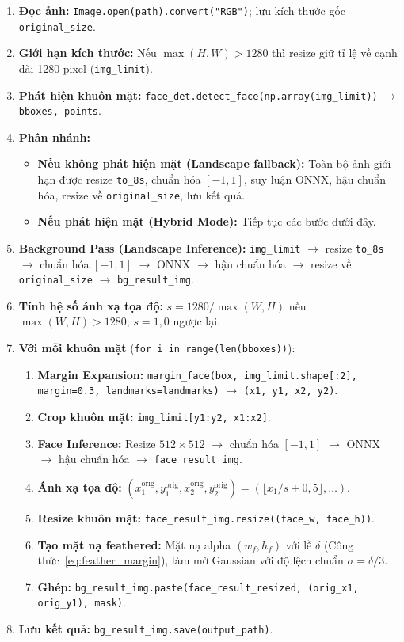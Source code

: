 \begin{enumerate}
    \item \textbf{Đọc ảnh:} \texttt{Image.open(path).convert("RGB")}; lưu kích thước gốc \texttt{original\_size}.
    \item \textbf{Giới hạn kích thước:} Nếu $\max(H,W) > 1280$ thì resize giữ tỉ lệ về cạnh dài 1280 pixel (\texttt{img\_limit}).
    \item \textbf{Phát hiện khuôn mặt:} \texttt{face\_det.detect\_face(np.array(img\_limit))} $\to$ \texttt{bboxes, points}.
    \item \textbf{Phân nhánh:}
    \begin{itemize}
        \item \textbf{Nếu không phát hiện mặt (Landscape fallback):} Toàn bộ ảnh giới hạn được resize \texttt{to\_8s}, chuẩn hóa $[-1,1]$, suy luận ONNX, hậu chuẩn hóa, resize về \texttt{original\_size}, lưu kết quả.
        \item \textbf{Nếu phát hiện mặt (Hybrid Mode):} Tiếp tục các bước dưới đây.
    \end{itemize}
    \item \textbf{Background Pass (Landscape Inference):} \texttt{img\_limit} $\to$ resize \texttt{to\_8s} $\to$ chuẩn hóa $[-1,1]$ $\to$ ONNX $\to$ hậu chuẩn hóa $\to$ resize về \texttt{original\_size} $\to$ \texttt{bg\_result\_img}.
    \item \textbf{Tính hệ số ánh xạ tọa độ:} $s = 1280 / \max(W, H)$ nếu $\max(W,H) > 1280$; $s = 1{,}0$ ngược lại.
    \item \textbf{Với mỗi khuôn mặt} (\texttt{for i in range(len(bboxes))}):
    \begin{enumerate}
        \item \textbf{Margin Expansion:} \texttt{margin\_face(box, img\_limit.shape[:2], margin=0.3, landmarks=landmarks)} $\to$ \texttt{(x1, y1, x2, y2)}.
        \item \textbf{Crop khuôn mặt:} \texttt{img\_limit[y1:y2, x1:x2]}.
        \item \textbf{Face Inference:} Resize $512 \times 512$ $\to$ chuẩn hóa $[-1,1]$ $\to$ ONNX $\to$ hậu chuẩn hóa $\to$ \texttt{face\_result\_img}.
        \item \textbf{Ánh xạ tọa độ:} $(x_1^{\text{orig}}, y_1^{\text{orig}}, x_2^{\text{orig}}, y_2^{\text{orig}}) = (\lfloor x_1/s + 0{,}5 \rfloor, \dots)$.
        \item \textbf{Resize khuôn mặt:} \texttt{face\_result\_img.resize((face\_w, face\_h))}.
        \item \textbf{Tạo mặt nạ feathered:} Mặt nạ alpha $(w_f, h_f)$ với lề $\delta$ (Công thức~\eqref{eq:feather_margin}), làm mờ Gaussian với độ lệch chuẩn $\sigma = \delta/3$.
        \item \textbf{Ghép:} \texttt{bg\_result\_img.paste(face\_result\_resized, (orig\_x1, orig\_y1), mask)}.
    \end{enumerate}
    \item \textbf{Lưu kết quả:} \texttt{bg\_result\_img.save(output\_path)}.
\end{enumerate}

